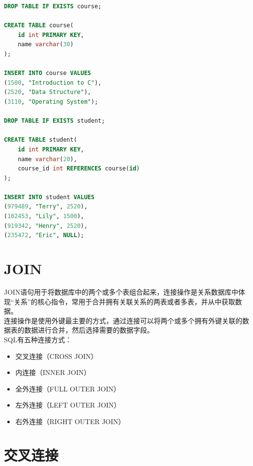 \documentclass[12pt, openany, oneside]{book}
\begin{document}
\vspace{0.5cm}


\begin{lstlisting}[language=SQL]
DROP TABLE IF EXISTS course;

CREATE TABLE course(
    id int PRIMARY KEY,
    name varchar(30)
);

INSERT INTO course VALUES
(1500, "Introduction to C"),
(2520, "Data Structure"),
(3110, "Operating System");

DROP TABLE IF EXISTS student;

CREATE TABLE student(
    id int PRIMARY KEY,
    name varchar(20),
    course_id int REFERENCES course(id)
);

INSERT INTO student VALUES
(979489, "Terry", 2520),
(102453, "Lily", 1500),
(919342, "Henry", 2520),
(235472, "Eric", NULL);
\end{lstlisting}

\vspace{0.5cm}

\section{JOIN}

JOIN语句用于将数据库中的两个或多个表组合起来，连接操作是关系数据库中体现“关系”的核心指令，常用于合并拥有关联关系的两表或者多表，并从中获取数据。\\

连接操作是使用外键最主要的方式，通过连接可以将两个或多个拥有外键关联的数据表的数据进行合并，然后选择需要的数据字段。\\

SQL有五种连接方式：

\begin{itemize}
	\item 交叉连接（CROSS JOIN）
	\item 内连接（INNER JOIN）
	\item 全外连接（FULL OUTER JOIN）
	\item 左外连接（LEFT OUTER JOIN）
	\item 右外连接（RIGHT OUTER JOIN）
\end{itemize}

\vspace{0.5cm}

\section{交叉连接}
\end{document}
